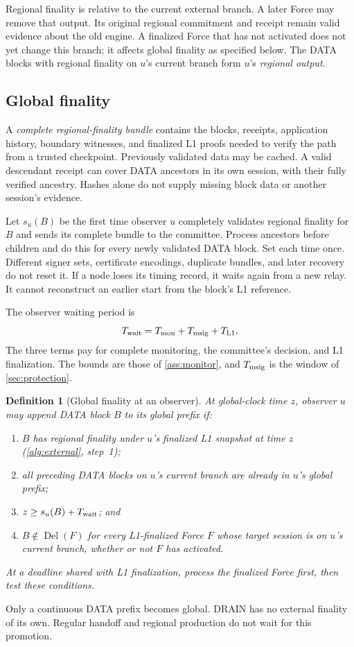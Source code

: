 \documentclass[11pt,a4paper]{article}
\newif\ifrevmarks
\newcommand{\Rv}[1]{\ifrevmarks\leavevmode{\color{rvBlue}#1}\else#1\fi}
\newcommand{\Cid}[1]{\ifrevmarks\textsuperscript{\hyperlink{chg:#1}{\color{rvBlue}\sffamily\scriptsize#1}}\fi}
\newcommand{\Del}{\operatorname{Del}}
\newcommand{\Twait}{T_{\rm wait}}
\newtheorem{definition}{Definition}[section]
\begin{document}
Regional finality is relative to the current external branch. A later
Force may remove that output. Its original regional commitment and
receipt remain valid evidence about the old engine. A finalized Force
that has not activated does not yet change this branch; it affects
global finality as specified below. \Rv{The DATA blocks with
regional finality on $u$'s current branch form $u$'s \emph{regional
output}.}

\subsection{Global finality}
\label{sec:global-finality}
A \emph{complete regional-finality bundle} contains the blocks, receipts,
application history, boundary witnesses, and finalized L1 proofs needed
to verify the path from a trusted checkpoint. Previously validated data
may be cached. A valid descendant receipt can cover DATA ancestors in
its own \Rv{session}, with their fully verified ancestry. Hashes
alone do not supply missing block data or another session's evidence.

Let $s_u(B)$ be the first time observer $u$ completely validates regional
finality for $B$ and sends its complete bundle to the \Rv{committee}.
Process ancestors before children and do this for every newly
validated DATA block. Set each time once. Different signer sets,
certificate encodings, duplicate bundles, and later recovery do not reset
it. If a node loses its timing record, it waits again from a new relay.
It cannot reconstruct an earlier start from the block's L1 reference.

\Rv{The observer waiting period is}
\[
 \Rv{\Twait}=T_{\rm mon}+T_{\rm msig}+T_{\rm L1}.
\]
The three terms pay for complete monitoring, the committee's decision,
and L1 finalization. The bounds are those of \cref{ass:monitor}\Rv{, and
$T_{\rm msig}$ is the window of \cref{sec:protection}}.

\begin{definition}[Global finality at an observer]
\label{def:global-finality}
At global-clock time $z$, observer $u$ may append DATA block $B$ to its
global prefix if:
\begin{enumerate}[label=(\roman*)]
\item $B$ has regional finality under \Rv{$u$'s finalized L1
snapshot at time $z$ (\cref{alg:external}, step~1)};
\item all preceding DATA blocks \Rv{on $u$'s current branch} are already
in $u$'s global prefix;
\item $z\ge s_u(B)+\Rv{\Twait}$; and
\item \Rv{$B\notin\Del(F)$ for every L1-finalized Force $F$
whose target session is on $u$'s current branch, whether or not $F$ has
activated.}
\end{enumerate}
At a deadline shared with L1 finalization, process the finalized Force
first, then test these conditions.
\end{definition}
Only a continuous DATA prefix becomes global. DRAIN has no external
finality of its own. Regular handoff and regional production do not
wait for this promotion.
\end{document}
